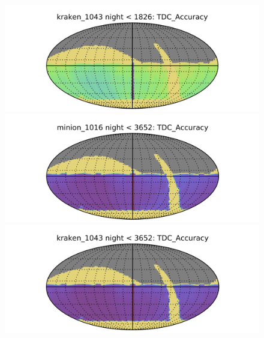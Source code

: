 \begin{figure}[!ht]
\begin{minipage}[b]{\linewidth}
\begin{minipage}[b]{0.48\linewidth}
    \end{minipage} \hfill
    \begin{minipage}[b]{0.48\linewidth}
       \centering\includegraphics[width=\linewidth]{figs/lenstimedelays/kraken_1043_TDC_Accuracy_night_lt_1826_HEAL_SkyMap.png}
    \end{minipage}
  \end{minipage}
  \begin{minipage}[b]{\linewidth}
    \begin{minipage}[b]{0.48\linewidth}
       \centering\includegraphics[width=\linewidth]{figs/lenstimedelays/minion_1016_TDC_Accuracy_night_lt_3652_HEAL_SkyMap.png}
    \end{minipage} \hfill
    \begin{minipage}[b]{0.48\linewidth}
       \centering\includegraphics[width=\linewidth]{figs/lenstimedelays/kraken_1043_TDC_Accuracy_night_lt_3652_HEAL_SkyMap.png}

\end{minipage}
\end{minipage}
\end{figure}
